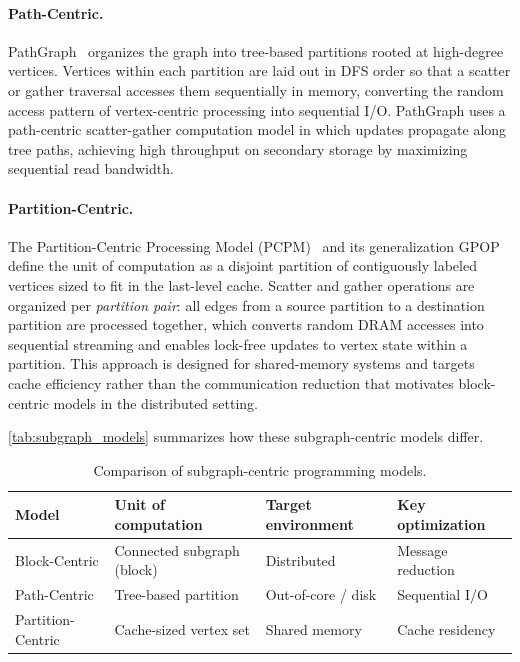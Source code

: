\paragraph{Path-Centric.}
PathGraph~\cite{yuan2016pathgraph} organizes the graph into tree-based partitions rooted at high-degree vertices.
Vertices within each partition are laid out in DFS order so that a scatter or gather traversal accesses them sequentially in memory, converting the random access pattern of vertex-centric processing into sequential I/O.
PathGraph uses a path-centric scatter-gather computation model in which updates propagate along tree paths, achieving high throughput on secondary storage by maximizing sequential read bandwidth.

\paragraph{Partition-Centric.}
The Partition-Centric Processing Model (PCPM)~\cite{lakhotia2018accelerating} and its generalization GPOP~\cite{lakhotia2020gpop} define the unit of computation as a disjoint partition of contiguously labeled vertices sized to fit in the last-level cache.
Scatter and gather operations are organized per \emph{partition pair}: all edges from a source partition to a destination partition are processed together, which converts random DRAM accesses into sequential streaming and enables lock-free updates to vertex state within a partition.
This approach is designed for shared-memory systems and targets cache efficiency rather than the communication reduction that motivates block-centric models in the distributed setting.

\autoref{tab:subgraph_models} summarizes how these subgraph-centric models differ.

\begin{table}[t]
\centering
\small
\caption{Comparison of subgraph-centric programming models.}
\label{tab:subgraph_models}
\begin{tabular}{llll}
\toprule
\textbf{Model} & \textbf{Unit of computation} & \textbf{Target environment} & \textbf{Key optimization} \\
\midrule
Block-Centric  & Connected subgraph (block) & Distributed & Message reduction \\
Path-Centric   & Tree-based partition       & Out-of-core / disk & Sequential I/O \\
Partition-Centric & Cache-sized vertex set  & Shared memory & Cache residency \\
\bottomrule
\end{tabular}
\end{table}


